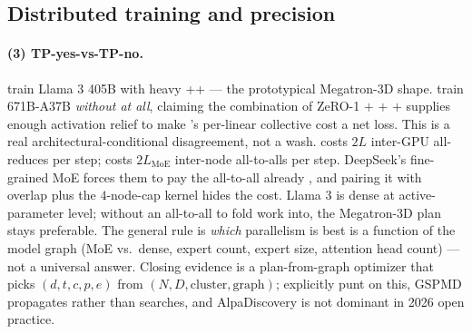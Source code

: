 \subsection{Distributed training and precision}
\label{sec:contradictions-dist-prec}

\paragraph{(3) TP-yes-vs-TP-no.}
\citet{meta-llama3} train Llama 3 405B with heavy ++ --- the
prototypical Megatron-3D shape. \citet{deepseek-v3} train
 671B-A37B \emph{without  at all}, claiming the
combination of ZeRO-1  $+$  $+$  $+$  supplies enough
activation relief to make 's per-linear collective cost a net
loss. This is a real architectural-conditional disagreement, not a
wash.  costs $2L$ inter-GPU all-reduces per step;  costs
$2 L_{\text{MoE}}$ inter-node all-to-alls per step. DeepSeek's
fine-grained MoE forces them to pay the  all-to-all already
\citep[\S 3.2]{deepseek-v3}, and pairing it with  overlap
plus the $4$-node-cap kernel hides the cost. Llama 3 is dense at
active-parameter level; without an  all-to-all to fold  work
into, the Megatron-3D plan stays preferable. The general rule is
\emph{which} parallelism is best is a function of the model graph
(MoE vs.\ dense, expert count, expert size, attention head count) ---
not a universal answer. Closing evidence is a plan-from-graph
optimizer that picks $(d, t, c, p, e)$ from $(N, D, \text{cluster},
\text{graph})$; \citet[\S 1]{torchtitan2024} explicitly punt on this,
GSPMD propagates rather than searches, and AlpaDiscovery is not
dominant in 2026 open practice.

